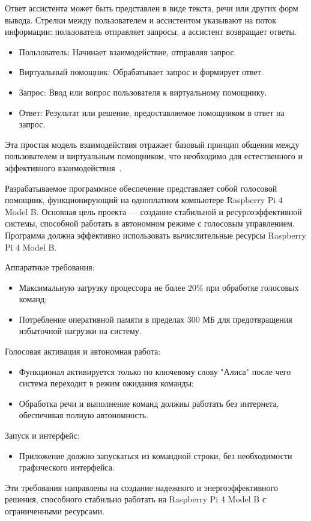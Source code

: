  Ответ ассистента может быть представлен в виде текста, речи или других форм вывода. Стрелки между пользователем и ассистентом указывают на поток информации: пользователь отправляет запросы, а ассистент возвращает ответы.
 
 \begin{itemize}
 	\item Пользователь: Начинает взаимодействие, отправляя запрос.
 	\item Виртуальный помощник: Обрабатывает запрос и формирует ответ.
 	\item Запрос: Ввод или вопрос пользователя к виртуальному помощнику.
 	\item Ответ: Результат или решение, предоставляемое помощником в ответ на запрос.
 \end{itemize}
 
 Эта простая модель взаимодействия отражает базовый принцип общения между пользователем и виртуальным помощником, что необходимо для естественного и эффективного взаимодействия~\cite{name22}.
 
 
 

Разрабатываемое программное обеспечение представляет собой голосовой помощник, функционирующий на одноплатном компьютере Raspberry Pi 4 Model B.
Основная цель проекта — создание стабильной и ресурсоэффективной системы, способной работать в автономном режиме с голосовым управлением.
Программа должна эффективно использовать вычислительные ресурсы Raspberry Pi 4 Model B.

Аппаратные требования:
\begin{itemize}
	\item Максимальную загрузку процессора не более 20\% при обработке голосовых команд;
	\item Потребление оперативной памяти в пределах 300 МБ для предотвращения избыточной нагрузки на систему.
\end{itemize}

Голосовая активация и автономная работа:
\begin{itemize}
	\item Функционал активируется только по ключевому слову "Алиса" после чего система переходит в режим ожидания команды;
	\item Обработка речи и выполнение команд должны работать без интернета, обеспечивая полную автономность.
\end{itemize}

Запуск и интерфейс:
\begin{itemize}
	\item Приложение должно запускаться из командной строки, без необходимости графического интерфейса.
\end{itemize}

Эти требования направлены на создание надежного и энергоэффективного решения, способного стабильно работать на Raspberry Pi 4 Model B с ограниченными ресурсами.
\newpage
